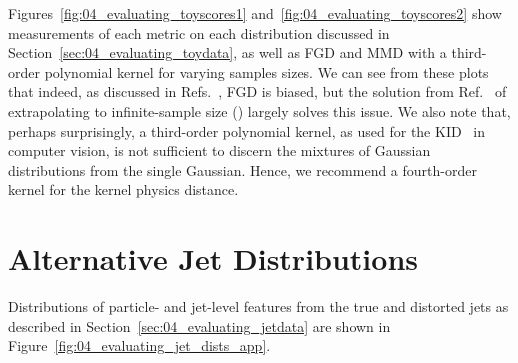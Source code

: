 Figures~\ref{fig:04_evaluating_toyscores1} and~\ref{fig:04_evaluating_toyscores2} show measurements of each metric on each distribution discussed in Section~\ref{sec:04_evaluating_toydata}, as well as FGD and MMD with a third-order polynomial kernel for varying samples sizes.
We can see from these plots that indeed, as discussed in Refs.~\cite{binkowski_demystifying, chong_unbiasedfid}, FGD is biased, but the solution from Ref.~\cite{chong_unbiasedfid} of extrapolating to infinite-sample size (\fgdinf) largely solves this issue.
We also note that, perhaps surprisingly, a third-order polynomial kernel, as used for the KID~\cite{binkowski_demystifying} in computer vision, is not sufficient to discern the mixtures of Gaussian distributions from the single Gaussian.
Hence, we recommend a fourth-order kernel for the kernel physics distance.

\section{Alternative Jet Distributions}
\label{app:04_evaluating_jet_plots}


Distributions of particle- and jet-level features from the true and distorted jets as described in Section~\ref{sec:04_evaluating_jetdata} are shown in Figure~\ref{fig:04_evaluating_jet_dists_app}.\\

